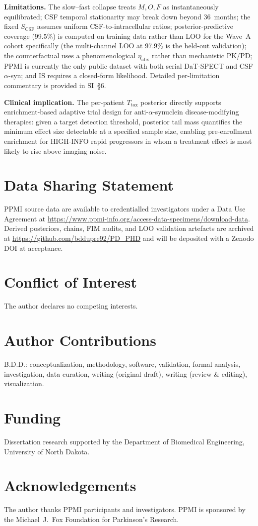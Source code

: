 \textbf{Limitations.} The slow--fast collapse treats $M, O, F$ as instantaneously equilibrated; CSF temporal stationarity may break down beyond 36~months; the fixed $S_\text{CSF}$ assumes uniform CSF-to-intracellular ratios; posterior-predictive coverage (99.5\%) is computed on training data rather than LOO for the Wave~A cohort specifically (the multi-channel LOO at 97.9\% is the held-out validation); the counterfactual uses a phenomenological $\eta_\text{abx}$ rather than mechanistic PK/PD; PPMI is currently the only public dataset with both serial DaT-SPECT and CSF $\alpha$-syn; and IS requires a closed-form likelihood. Detailed per-limitation commentary is provided in SI~\S6.

\textbf{Clinical implication.} The per-patient $T_\text{tox}$ posterior directly supports enrichment-based adaptive trial design for anti-$\alpha$-synuclein disease-modifying therapies: given a target detection threshold, posterior tail mass quantifies the minimum effect size detectable at a specified sample size, enabling pre-enrollment enrichment for HIGH-INFO rapid progressors in whom a treatment effect is most likely to rise above imaging noise.

\section*{Data Sharing Statement}

PPMI source data are available to credentialled investigators under a Data Use Agreement at \url{https://www.ppmi-info.org/access-data-specimens/download-data}. Derived posteriors, chains, FIM audits, and LOO validation artefacts are archived at \url{https://github.com/bddupre92/PD_PHD} and will be deposited with a Zenodo DOI at acceptance.

\section*{Conflict of Interest}

The author declares no competing interests.

\section*{Author Contributions}

B.D.D.: conceptualization, methodology, software, validation, formal analysis, investigation, data curation, writing (original draft), writing (review \& editing), visualization.

\section*{Funding}

Dissertation research supported by the Department of Biomedical Engineering, University of North Dakota.

\section*{Acknowledgements}

The author thanks PPMI participants and investigators. PPMI is sponsored by the Michael~J.~Fox Foundation for Parkinson's Research.

